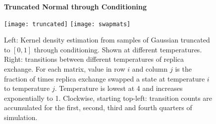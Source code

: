 \begin{figure}[!htb]
\centering
\textbf{Truncated Normal through Conditioning}\par\medskip
\texttt{[image: truncated]}
\texttt{[image: swapmats]}

	
	
	\caption{Left: Kernel density estimation from samples of Gaussian truncated to $[0, 1]$ through conditioning. Shown at different temperatures. Right: transitions between different temperatures of replica exchange.  For each matrix, value in row $i$ and column $j$ is the fraction of times replica exchange swapped a state at temperature $i$ to temperature $j$.  Temperature is lowest at 4 and increases exponentially to 1.  Clockwise, starting top-left: transition counts are accumulated for the first, second, third and fourth quarters of simulation.}
	\label{fig:density}
	\vspace{-.5em}
\end{figure}



